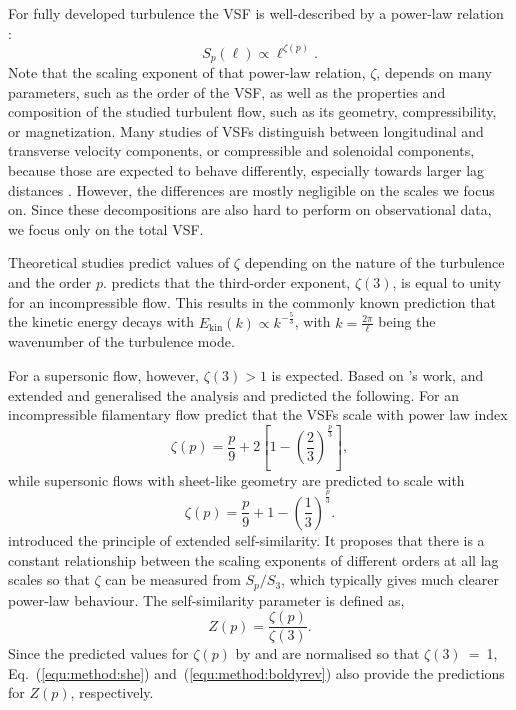 For fully developed turbulence the VSF is well-described by a power-law relation \citep{Kolmogorov1941,She1994,Boldyrev2002}:
\begin{equation}
	\mathit{S}_p (\ell) \propto \ell^{\zeta(p)}.
	\label{equ:method:propto_zeta}
\end{equation}
Note that the scaling exponent of that power-law relation, $\zeta$, depends on many parameters, such as the order of the VSF, as well as the properties and composition of the studied turbulent flow, such as its geometry, compressibility, or magnetization.
Many studies of VSFs distinguish between longitudinal and transverse velocity components, or compressible and solenoidal components, because those are expected to behave differently, especially towards larger lag distances \citep{Gotoh2002,Schmidt2008,Benzi2010}.
However, the differences are mostly negligible on the scales we focus on. 
Since these decompositions are also hard to perform on observational data, we focus only on the total VSF.

Theoretical studies predict values of $\zeta$ depending on the nature of the turbulence and the order $p$.
\citet{Kolmogorov1941} predicts that the third-order exponent, $\zeta(3)$, is equal to unity for an incompressible flow.
This results in the commonly known prediction that the kinetic energy decays with $E_{\mathrm{kin}}(k) \propto k^{-\frac{5}{3}}$, with $k = \frac{2 \pi}{\ell}$ being the wavenumber of the turbulence mode.

For a supersonic flow, however, $\zeta(3) >1$ is expected.
Based on \citeauthor{Kolmogorov1941}'s work, \citet{She1994} and \citet{Boldyrev2002} extended and generalised the analysis and predicted the following.
For an incompressible filamentary flow \citet{She1994} predict that
the VSFs scale with power law index
\begin{equation}
	\zeta(p) = \frac{p}{9} + 2 \left[ 1 - \left( \frac{2}{3} \right)^{\frac{p}{3}} \right] ,
	\label{equ:method:she}
\end{equation}
while supersonic flows with sheet-like geometry are predicted to scale with \citep{Boldyrev2002}
\begin{equation}
	\zeta(p) = \frac{p}{9} + 1 - \left( \frac{1}{3} \right)^{\frac{p}{3}}.
	\label{equ:method:boldyrev}
\end{equation}
\citet{Benzi1993} introduced the principle of extended self-similarity.
It proposes that there is a constant relationship between the scaling
exponents of different orders at all lag scales so that $\zeta$ can be measured from $S_p/S_3$, which typically gives much clearer power-law behaviour.
The self-similarity parameter is defined as,
\begin{equation}
	Z(p) = \frac{\zeta(p)}{\zeta(3)}.
	\label{equ:method:z_def}
\end{equation} 
Since the predicted values for $\zeta(p)$ by \citet{She1994} and \citet{Boldyrev2002} are normalised so that $\zeta(3)$~=~1, Eq.~(\ref{equ:method:she}) and~(\ref{equ:method:boldyrev}) also provide the predictions for $Z(p)$, respectively.

